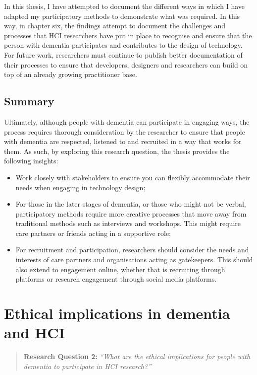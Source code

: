 In this thesis, I have attempted to document the different ways in which I have adapted my participatory methods to demonstrate what was required. In this way, in chapter six, the findings attempt to document the challenges and processes that HCI researchers have put in place to recognise and ensure that the person with dementia participates and contributes to the design of technology. For future work, researchers must continue to publish better documentation of their processes to ensure that developers, designers and researchers can build on top of an already growing practitioner base.

\subsection{Summary}
\label{RQ1:Summary}
Ultimately, although people with dementia can participate in engaging ways, the process requires thorough consideration by the researcher to ensure that people with dementia are respected, listened to and recruited in a way that works for them. As such, by exploring this research question, the thesis provides the following insights:

\begin{itemize}
    \item Work closely with stakeholders to ensure you can flexibly accommodate their needs when engaging in technology design;
    \item For those in the later stages of dementia, or those who might not be verbal, participatory methods require more creative processes that move away from traditional methods such as interviews and workshops. This might require care partners or friends acting in a supportive role;
    \item For recruitment and participation, researchers should consider the needs and interests of care partners and organisations acting as gatekeepers. This should also extend to engagement online, whether that is recruiting through platforms or research engagement through social media platforms. 
\end{itemize}

\section{Ethical implications in dementia and HCI}
\label{Discussion:RQ2}
\begin{quote}
\textbf{    Research Question 2:
}    
\textit{    “What are the ethical implications for people with dementia to participate in HCI research?”}
\end{quote}


